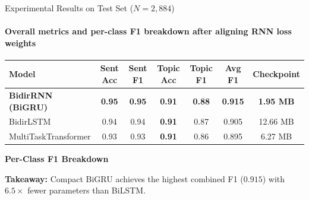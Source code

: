 \documentclass[aspectratio=169,10pt]{beamer}
\begin{document}
\begin{frame}{Experimental Results on Test Set ($N = 2,884$)}
  \framesubtitle{Overall metrics and per-class F1 breakdown after aligning RNN loss weights}
  \begin{table}
    \centering
    \footnotesize
    \begin{tabular}{lcccccc}
      \toprule
      \textbf{Model} & \textbf{Sent Acc} & \textbf{Sent F1} & \textbf{Topic Acc} & \textbf{Topic F1} & \textbf{Avg F1} & \textbf{Checkpoint} \\
      \midrule
      \textbf{BidirRNN (BiGRU)} & \textbf{0.95} & \textbf{0.95} & \textbf{0.91} & \textbf{0.88} & \textbf{0.915} & \textbf{1.95 MB} \\
      BidirLSTM                 & 0.94          & 0.94          & \textbf{0.91} & 0.87          & 0.905          & 12.66 MB \\
      MultiTaskTransformer      & 0.93          & 0.93          & \textbf{0.91} & 0.86          & 0.895          & 6.27 MB \\
      \bottomrule
    \end{tabular}
  \end{table}

  \vspace{0.25cm}
  \textbf{Per-Class F1 Breakdown}
  \vspace{0.15em}
  \begin{table}
    \centering
    \scriptsize
    \setlength{\tabcolsep}{6pt}
  \end{table}

  \vspace{0.2cm}
  {\scriptsize\color{bwGray}
    \textbf{Takeaway:} Compact BiGRU achieves the highest combined F1 ($0.915$) with $6.5\times$ fewer parameters than BiLSTM.
  }
\end{frame}
\end{document}
